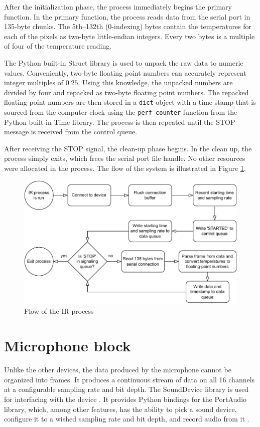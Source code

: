 After the initialization phase, the process immediately begins the primary function.
In the primary function, the process reads data from the serial port in 135-byte chunks.
The 5th--132th (0-indexing) bytes contain the temperatures for each of the pixels as two-byte little-endian integers.
Every two bytes is a multiple of four of the temperature reading.

The Python built-in Struct library is used to unpack the raw data to numeric values.
Conveniently, two-byte floating point numbers can accurately represent integer multiples of $0.25$.
Using this knowledge, the unpacked numbers are divided by four and repacked as two-byte floating point numbers.
The repacked floating point numbers are then stored in a \texttt{dict} object with a time stamp that is sourced 
from the computer clock using the \texttt{perf\_counter} function from the Python built-in Time library.
The process is then repeated until the STOP message is received from the control queue.

After receiving the STOP signal, the clean-up phase begins.
In the clean up, the process simply exits,
which frees the serial port file handle.
No other resources were allocated in the process.
The flow of the system is illustrated in Figure \ref{fig:3-ir-flowchart}.

\begin{figure}
    \centering
    \includegraphics[width=\textwidth]{fig/3/ir-flowchart.pdf}
    \caption{Flow of the IR process}
    \label{fig:3-ir-flowchart}
\end{figure}

\section{Microphone block}
\label{sec:3-mic}
Unlike the other devices, the data produced by the microphone cannot be organized into frames.
It produces a continuous stream of data on all 16 channels at a configurable sampling rate and bit depth.
The SoundDevice library is used for interfacing with the device \cite{sounddevice-docs}.
It provides Python bindings for the PortAudio library,
which, among other features, has the ability to pick a sound device,
configure it to a wished sampling rate and bit depth, and record audio from it \cite{portaudio}.

